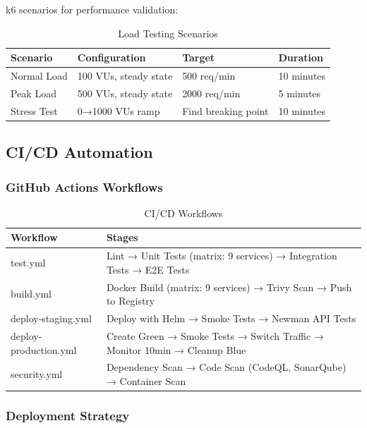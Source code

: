 \documentclass[11pt,letterpaper]{article}
\begin{document}
k6 scenarios for performance validation:

\begin{table}[H]
\centering
\begin{tabularx}{\textwidth}{lXll}
\toprule
\textbf{Scenario} & \textbf{Configuration} & \textbf{Target} & \textbf{Duration} \\
\midrule
Normal Load & 100 VUs, steady state & 500 req/min & 10 minutes \\
Peak Load & 500 VUs, steady state & 2000 req/min & 5 minutes \\
Stress Test & 0→1000 VUs ramp & Find breaking point & 10 minutes \\
\bottomrule
\end{tabularx}
\caption{Load Testing Scenarios}
\end{table}

\subsection{CI/CD Automation}

\subsubsection{GitHub Actions Workflows}

\begin{table}[H]
\centering
\small
\begin{tabularx}{\textwidth}{lX}
\toprule
\textbf{Workflow} & \textbf{Stages} \\
\midrule
test.yml & Lint → Unit Tests (matrix: 9 services) → Integration Tests → E2E Tests \\
build.yml & Docker Build (matrix: 9 services) → Trivy Scan → Push to Registry \\
deploy-staging.yml & Deploy with Helm → Smoke Tests → Newman API Tests \\
deploy-production.yml & Create Green → Smoke Tests → Switch Traffic → Monitor 10min → Cleanup Blue \\
security.yml & Dependency Scan → Code Scan (CodeQL, SonarQube) → Container Scan \\
\bottomrule
\end{tabularx}
\caption{CI/CD Workflows}
\end{table}

\subsubsection{Deployment Strategy}
\end{document}
